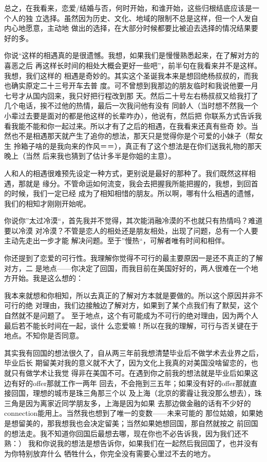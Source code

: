 \documentclass[11pt]{article}
\begin{document}
总之，在我看来，恋爱/结婚与否，何时开始，和谁开始，这些归根结底应该是一个人的独
立选择。虽然因为历史、文化、地域的限制不总是这样，但一个人发自内心地愿意，主动地
做出的选择，在大部分时候都要比被迫去选择的情况结果要好的多。

你说“这样的相遇真的是很遗憾。我想，如果我们是慢慢熟悉起来，在了解对方的喜恶之后
再这样长时间的相处大概会更好一些吧”，前半句在我看来并不是这样。我想，我们这样的
相遇是奇妙的。其实这个圣诞我本来是想回绝杨叔叔的，而我也确实原定二十三号开车去普
度。可不曾想到我那边的朋友临时和我说他要一月七号才从国内回来，我只好把行程改到那
天。然后二十号左右杨叔叔又给我打了几个电话，挨不过他的热情，最后一次我问他有没有
同龄人（当时想不然我一个小辈过去要是面对的都是他这样的长辈咋办），他说有，然后把
你联系方式告诉我看我能不能和你一起过来。所以才有了之后的相遇，在我看来还真有些奇
妙。当然也不是相遇那天就产生了追你的想法，那天只是觉得你是个可爱的小妹子（帮女生
拎箱子啥的是我向来的作风＝＝），真正有了这个想法是在你们送我礼物的那天晚上（当然
后来我也猜到了估计多半是你姐的主意）。

人和人的相遇很难预先设定一种方式，更别说是最好的那种了。我们既然这样相遇，那就是
缘分。不管命运如何流变，我会去把握我所能把握的，我想，到回首的时候，我们一定已经
成为了相知相惜的朋友。所以啊，哪有什么相遇的遗憾，我们的相知才刚刚开始呢。

你说你”太过冷漠“，首先我并不觉得，其次能消融冷漠的不也就只有热情吗？难道要以冷漠
对冷漠？不管是恋人的相处还是朋友相处，出现了问题，总有一个人要主动先走出一步才能
解决问题。至于”慢热“，可解者唯有时间和相伴。

你还提到了恋爱的可行性。我理解你觉得不可行的最主要原因一是还不真正的了解对方，二
是地点——你决定了回国，而我目前在美国好好的，两人很难在一个地方开始。我是这么想的：

我本来就想和你相知，所以去真正的了解对方本就是要做的。所以这个原因并非不可行的绝
对理由，我们边接触边了解对方，如果到了某个点我们有了默契，这个自然就不是问题了。
至于地点，这个有可能成为不可行的绝对理由，因为两个人最后若不能长时间在一起，谈什
么恋爱嘛！所以在我的理解，可行与否关键在于地点。不知你是否同意。

其实我有回国的想法很久了，自从两三年前我想清楚毕业后不做学术去业界之后，毕业后长
期留美对我的意义就不大了，因为文化上我真的对美国没啥留恋的，也就只有做学术让我觉
得非在美国不可。在遇到你之前我的想法就是毕业后如果这边有好的offer那就工作一两年
回去，不会拖到三五年；如果没有好的offer那就直接回国，理想的城市是珠三角那三个以
及上海（北京的雾霾让我没那么想去），珠三角是因为离家近同学朋友多，上海是因为如果
去那边做金融的话有不少好的connection能用上。当然我也想到了唯一的变数——未来可能的
那位姑娘，如果她是想留美的，那我想我也会决定留美；当然如果她想回国，那自然就按之
前回国的想法走。我不知道你回国后最想去哪，现在你也不必告诉我，因为我们还不熟：）
我和你说我的想法是想告诉你，如果我们在一起然后我回国了，也并没有为你特别放弃什么
牺牲什么，你完全没有需要心里过不去的地方。
\end{document}

